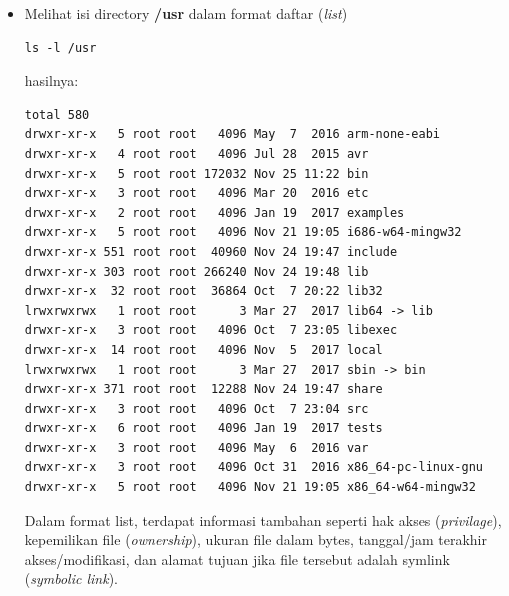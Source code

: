 \documentclass[12pt,]{article}
\begin{document}
\begin{itemize}
\begin{itemize}
			\item Melihat isi directory \textbf{/usr} dalam format daftar (\textit{list})
			\begin{verbatim}
ls -l /usr
			\end{verbatim}
			hasilnya:
			\begin{verbatim}
total 580
drwxr-xr-x   5 root root   4096 May  7  2016 arm-none-eabi
drwxr-xr-x   4 root root   4096 Jul 28  2015 avr
drwxr-xr-x   5 root root 172032 Nov 25 11:22 bin
drwxr-xr-x   3 root root   4096 Mar 20  2016 etc
drwxr-xr-x   2 root root   4096 Jan 19  2017 examples
drwxr-xr-x   5 root root   4096 Nov 21 19:05 i686-w64-mingw32
drwxr-xr-x 551 root root  40960 Nov 24 19:47 include
drwxr-xr-x 303 root root 266240 Nov 24 19:48 lib
drwxr-xr-x  32 root root  36864 Oct  7 20:22 lib32
lrwxrwxrwx   1 root root      3 Mar 27  2017 lib64 -> lib
drwxr-xr-x   3 root root   4096 Oct  7 23:05 libexec
drwxr-xr-x  14 root root   4096 Nov  5  2017 local
lrwxrwxrwx   1 root root      3 Mar 27  2017 sbin -> bin
drwxr-xr-x 371 root root  12288 Nov 24 19:47 share
drwxr-xr-x   3 root root   4096 Oct  7 23:04 src
drwxr-xr-x   6 root root   4096 Jan 19  2017 tests
drwxr-xr-x   3 root root   4096 May  6  2016 var
drwxr-xr-x   3 root root   4096 Oct 31  2016 x86_64-pc-linux-gnu
drwxr-xr-x   5 root root   4096 Nov 21 19:05 x86_64-w64-mingw32
			\end{verbatim}
			Dalam format list, terdapat informasi tambahan seperti hak akses (\textit{privilage}),
			kepemilikan file (\textit{ownership}),
			ukuran file dalam bytes,
			tanggal/jam terakhir akses/modifikasi,
			dan alamat tujuan jika file tersebut adalah symlink (\textit{symbolic link}).
			

\end{itemize}
\end{itemize}
\end{document}
